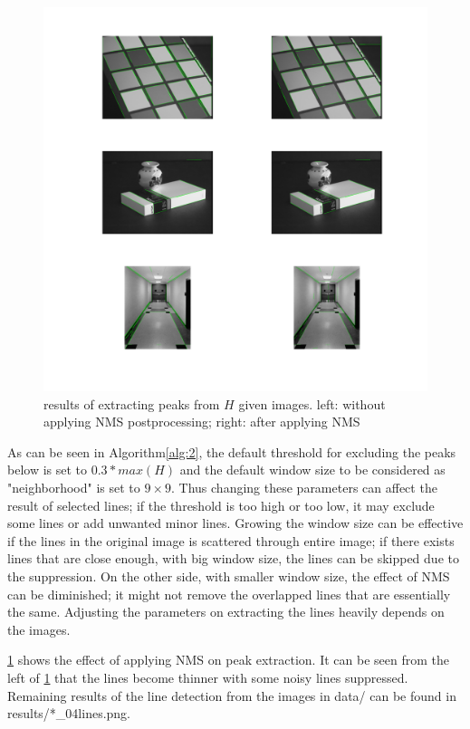 \documentclass[extendedabs]{bmvc2k}
\begin{document}
\begin{figure}[h]
    \centering
    \includegraphics[width=0.85\linewidth]{hw4_3_1}
    \caption{results of extracting peaks from $H$ given images. 
    left: without applying NMS postprocessing; right: after applying NMS}
    \label{fig:5}
\end{figure}

As can be seen in Algorithm\ref{alg:2}, the default threshold for excluding the peaks below is set to $0.3 * max(H)$
and the default window size to be considered as "neighborhood" is set to $9 \times 9$. Thus changing these parameters
can affect the result of selected lines; if the threshold is too high or too low, it may exclude some lines or add 
unwanted minor lines. Growing the window size can be effective if the lines in the original image is scattered 
through entire image; if there exists lines that are close enough, with big window size, the lines can be skipped 
due to the suppression. On the other side, with smaller window size, the effect of NMS can be diminished; it might 
not remove the overlapped lines that are essentially the same. Adjusting the parameters on extracting the lines 
heavily depends on the images.

\figurename{\ref{fig:5}} shows the effect of applying NMS on peak extraction. It can be seen from
the left of \figurename{\ref{fig:5}} that the lines become thinner with some noisy lines suppressed.
Remaining results of the line detection from the images in data/ can be found in
results/*\_04lines.png. 
\end{document}
